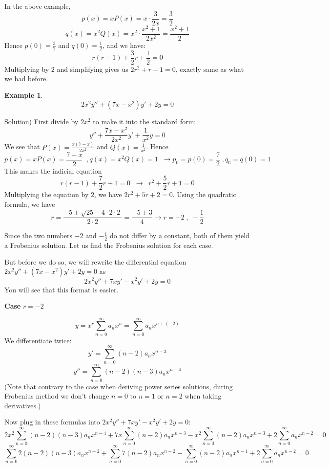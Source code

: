\documentclass[12pt]{report}
\newtheorem{ex}{Example}[section]
\begin{document}
In the above example,
$$p(x) = x P(x) = x \cdot \frac{3}{2x} = \frac{3}{2} $$
$$q(x) = x^2 Q(x) = x^2 \cdot \frac{x^2 +1 }{2x^2}  = \frac{x^2 +1 }{2} $$
Hence $p(0) =  \frac{3}{2} $ and $q(0) = \frac{1}{2} $, and we have:
$$r(r-1) + \frac{3}{2} r + \frac{1}{2} = 0 $$
Multiplying by $2$ and simplifying gives us $2r^2 + r -1=0$, exactly same as what we had before.


\begin{ex}
	$$2x^2 y'' + (7x-x^2) y' + 2y =0 $$
\end{ex}

Solution) First divide by $2x^2$ to make it into the standard form:
$$ y'' + \frac{7x-x^2}{2x^2} y' + \frac{1}{x^2} y =0 $$
We see that $P(x)=\frac{x(7-x)}{2x^2}$ and $Q(x)= \frac{1}{x^2}$. Hence
$$p(x) = x P(x) = \frac{7-x}{2} \; \; ,  q(x) = x^2 Q(x) = 1 \; \; \rightarrow p_0=p(0)=\frac{7}{2} \;, q_0=q(0)= 1$$
This makes the indicial equation
$$r(r-1) + \frac{7}{2} r + 1 = 0 \; \; \rightarrow \; \; r^2 + \frac{5}{2}r + 1 =0 $$
Multiplying the equation by $2$, we have $2r^2 + 5r + 2 =0$. Using the quadratic formula, we have
$$ r= \frac{-5 \pm \sqrt{25-4\cdot 2\cdot 2}}{2\cdot 2} = \frac{-5 \pm 3}{4} \rightarrow r= -2 \; , \; -\frac{1}{2}  $$ 
	
Since the two numbers $-2$ and $-\frac{1}{2}$ do not differ by a constant, both of them yield a Frobenius solution. Let us find the Frobenius solution for each case.

But before we do so, we will rewrite the differential equation $2x^2 y'' + (7x-x^2) y' + 2y =0 $ as 
$$2x^2 y'' + 7x y' -x^2y' + 2y =0 $$
You will see that this format is easier. 

\textbf{Case } $r=-2$

$$y = x^r \sum_{n=0}^{\infty} a_n x^n  = \sum_{n=0}^{\infty} a_n x^{n+(-2)}$$
We differentiate twice:
$$y' = \sum_{n=0}^{\infty} (n-2) a_n x^{n-3} $$
$$y'' = \sum_{n=0}^{\infty} (n-2)(n-3) a_n x^{n-4} $$
(Note that contrary to the case when deriving power series solutions, during Frobenius method we don't change $n=0$ to $n=1$ or $n=2$ when taking derivatives.)

Now plug in these formulas into $2x^2 y'' + 7x y' -x^2y' + 2y =0 $:
$$ 2x^2  \sum_{n=0}^{\infty} (n-2)(n-3) a_n x^{n-4} + 7x  \sum_{n=0}^{\infty} (n-2) a_n x^{n-3} - x^2  \sum_{n=0}^{\infty} (n-2) a_n x^{n-3} + 2 \sum_{n=0}^{\infty} a_n x^{n-2} = 0$$
$$ \sum_{n=0}^{\infty} 2(n-2)(n-3) a_n x^{n-2} +   \sum_{n=0}^{\infty} 7(n-2) a_n x^{n-2} -  \sum_{n=0}^{\infty} (n-2) a_n x^{n-1} + 2 \sum_{n=0}^{\infty} a_n x^{n-2} = 0$$
\end{document}
